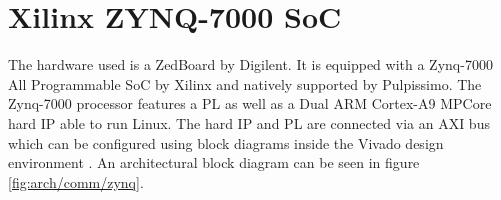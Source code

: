 \documentclass[../bachelor_paper.tex]{subfiles}
\begin{document}
\section{Xilinx ZYNQ-7000 SoC}
The hardware used is a ZedBoard by Digilent. It is equipped with a Zynq-7000 All Programmable \ac{SoC} by Xilinx and natively supported by Pulpissimo. The Zynq-7000 processor features a \ac{PL} as well as a Dual ARM Cortex-A9 MPCore hard IP able to run Linux. The hard IP and \ac{PL} are connected via an AXI bus which can be configured using block diagrams inside the Vivado design environment \cite{Zynq7000SoC}. An architectural block diagram can be seen in figure \ref{fig:arch/comm/zynq}.


\isstandalone



\fi
\end{document}
